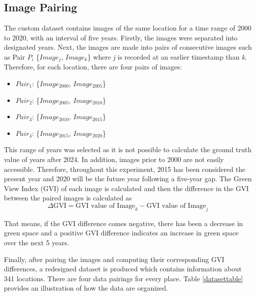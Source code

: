 \subsection{Image Pairing}
The custom dataset contains images of the same location for a time range of 2000 to 2020, with an interval of five years. Firstly, the images were separated into designated years. Next, the images are made into pairs of consecutive images such as Pair $P_i$ \{$Image_{j}$, $Image_{k}$\} 
where \textit{j} is recorded at an earlier timestamp than \textit{k}. Therefore, for each location, there are four pairs of images:
\begin{itemize}
  \item $Pair_1$: \{$Image_{2000}$, $Image_{2005}$\}
  \item $Pair_2$: \{$Image_{2005}$, $Image_{2010}$\}
  \item $Pair_3$: \{$Image_{2010}$, $Image_{2015}$\}
  \item $Pair_4$: \{$Image_{2015}$, $Image_{2020}$\}
\end{itemize} 
This range of years was selected as it is not possible to calculate the ground truth value of years after 2024. In addition, images prior to 2000 are not easily accessible. Therefore, throughout this experiment, 2015 has been considered the present year and 2020 will be the future year following a five-year gap. The Green View Index (GVI) of each image is calculated and then the difference in the GVI between the paired images is calculated as 
\begin{equation}
    \Delta\text{GVI} = \text{GVI value of Image}_{k} - \text{GVI value of Image}_{j}
    \label{eq:delta_gvi}
\end{equation}

That means, if the GVI difference comes negative, there has been a decrease in green space and a positive GVI difference indicates an increase in green space over the next 5 years.

Finally, after pairing the images and computing their corresponding GVI differences, a redesigned dataset is produced which contains information about 341 locations. There are four data pairings for every place. Table \ref{datasettable} provides an illustration of how the data are organized.

